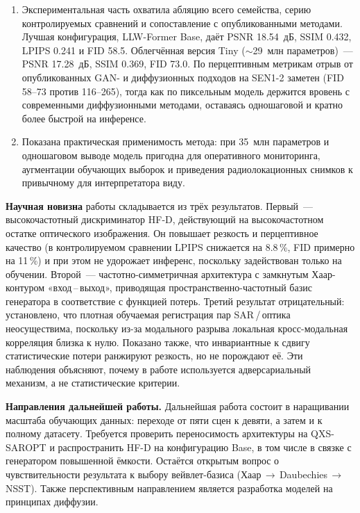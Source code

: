 \begin{enumerate}[label*=\arabic*.,leftmargin=2.0em,itemsep=0.3em,topsep=0.3em]
  \item Экспериментальная часть охватила абляцию всего семейства, серию
        контролируемых сравнений и сопоставление с опубликованными методами. Лучшая
        конфигурация, LLW-Former Base, даёт PSNR 18.54~дБ, SSIM 0.432, LPIPS 0.241 и
        FID 58.5. Облегчённая версия Tiny ($\sim$29~млн параметров)~--- PSNR 17.28~дБ,
        SSIM 0.369, FID 73.0. По перцептивным метрикам отрыв от опубликованных GAN- и
        диффузионных подходов на SEN1-2 заметен (FID 58--73 против 116--265), тогда как
        по пиксельным модель держится вровень с современными диффузионными методами,
        оставаясь одношаговой и кратно более быстрой на инференсе.
  \item Показана практическая применимость метода: при 35~млн параметров и
        одношаговом выводе модель пригодна для оперативного мониторинга, аугментации
        обучающих выборок и приведения радиолокационных снимков к привычному для
        интерпретатора виду.
\end{enumerate}

\medskip
\noindent\textbf{Научная новизна} работы складывается из трёх результатов.
Первый~--- высокочастотный дискриминатор HF-D, действующий на высокочастотном остатке
оптического изображения. Он повышает резкость и перцептивное качество (в
контролируемом сравнении LPIPS снижается на 8.8\,\%, FID примерно на 11\,\%) и при
этом не удорожает инференс, поскольку задействован только на обучении. Второй~---
частотно-симметричная архитектура с замкнутым Хаар-контуром «вход\,--\,выход»,
приводящая пространственно-частотный базис генератора в соответствие с функцией
потерь. Третий результат отрицательный: установлено, что плотная обучаемая регистрация пар
SAR\,/\,оптика неосуществима, поскольку из-за модального разрыва локальная
кросс-модальная корреляция близка к нулю. Показано также, что инвариантные к сдвигу
статистические потери ранжируют резкость, но не порождают её. Эти наблюдения объясняют,
почему в работе используется адверсариальный механизм, а не статистические критерии.

\medskip
\noindent\textbf{Направления дальнейшей работы.} Дальнейшая работа состоит в
наращивании масштаба обучающих данных: переходе от пяти сцен к девяти, а затем и к
полному датасету. Требуется проверить переносимость архитектуры на QXS-SAROPT и
распространить HF-D на конфигурацию Base, в том числе в связке с генератором повышенной
ёмкости. Остаётся открытым вопрос о чувствительности результата к выбору вейвлет-базиса
(Хаар\,$\rightarrow$\,Daubechies\,$\rightarrow$\,NSST).
Также перспективным направлением является разработка моделей на принципах диффузии.

\newpage
